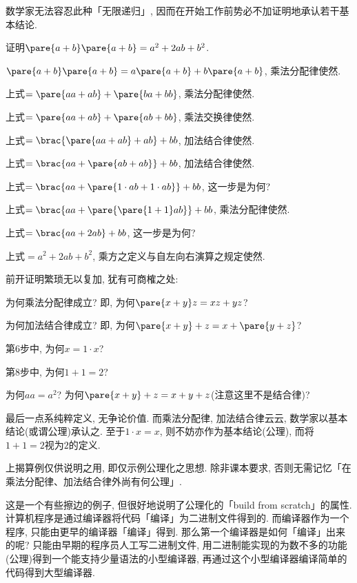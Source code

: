 \documentclass[hidelinks]{ctexart}
\begin{document}
数学家无法容忍此种「无限递归」, 因而在开始工作前势必不加证明地承认若干基本结论.
\begin{sample}
    \begin{ex}
        \label{ex:平方展开}
        证明$\pare{a+b}\pare{a+b} = a^2+2ab+b^2$.
    \end{ex}
    \begin{cenum}
        \item $\pare{a+b}\pare{a+b} = a\pare{a+b} + b\pare{a+b}$, 乘法分配律使然.
        \item 上式$= \pare{aa + ab} + \pare{ba + bb}$, 乘法分配律使然.
        \item 上式$= \pare{aa + ab} + \pare{ab + bb}$, 乘法交换律使然.
        \item 上式$= \brac{\pare{aa + ab} + ab} + bb$, 加法结合律使然.
        \item 上式$= \brac{aa + \pare{ab + ab}} + bb$, 加法结合律使然.
        \item 上式$= \brac{aa + \pare{1\cdot ab + 1\cdot ab}} + bb$, 这一步是为何?
        \item 上式$= \brac{aa + \pare{\pare{1+1}ab}} + bb$, 乘法分配律使然.
        \item 上式$= \brac{aa + 2ab} + bb$, 这一步是为何?
        \item 上式$= a^2 + 2ab + b^2$, 乘方之定义与自左向右演算之规定使然.
    \end{cenum}
\end{sample}
前开证明繁琐无以复加, 犹有可商榷之处:
\begin{cenum}
    \item {\color{red}为何乘法分配律成立?} 即, 为何$\pare{x+y}z = xz+yz$?
    \item {\color{red}为何加法结合律成立?} 即, 为何$\pare{x+y} + z = x + \pare{y+z}$?
    \item 第$6$步中, {\color{red}为何$x=1\cdot x$?}
    \item 第$8$步中, {\color{red}为何$1+1=2$?}
    \item 为何$aa=a^2$? 为何$\pare{x+y}+z = x+y+z$(注意这里不是结合律)?
\end{cenum}
最后一点系纯粹定义, 无争论价值. 而乘法分配律, 加法结合律云云, 数学家以基本结论(或谓公理)承认之. 至于$1\cdot x = x$, 则不妨亦作为基本结论(公理), 而将$1+1=2$视为$2$的定义.
\begin{remark}
    上揭算例仅供说明之用, 即仅示例公理化之思想. 除非课本要求, 否则无需记忆「在乘法分配律、加法结合律外尚有何公理」.
\end{remark}
\begin{sample}
    \begin{ex}
        这是一个有些擦边的例子, 但很好地说明了公理化的「build from scratch」的属性. 计算机程序是通过编译器将代码「编译」为二进制文件得到的. 而编译器作为一个程序, 只能由更早的编译器「编译」得到. 那么第一个编译器是如何「编译」出来的呢? 只能由早期的程序员人工写二进制文件, 用二进制能实现的为数不多的功能(公理)得到一个能支持少量语法的小型编译器, 再通过这个小型编译器编译简单的代码得到大型编译器.
    \end{ex}
\end{sample}
\end{document}
